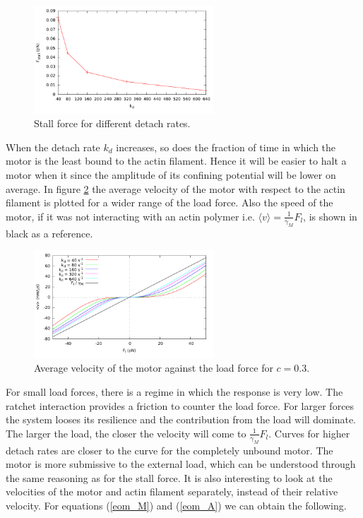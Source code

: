 \documentclass[aps,pre,onecolumn,showpacs,showkeys,a4paper]{revtex4}
\begin{document}
\begin{figure}[h]
\centering
\includegraphics[width=0.6\textwidth,height=!]{k_Fstall}
\caption{Stall force for different detach rates.}
\label{Fig: k_Fstall} 
\end{figure}
When the detach rate $k_{d}$ increases, so does the fraction of time in which the motor is the least bound to the actin filament. Hence it will be easier to halt a motor when it since the amplitude of its confining potential will be lower on average.
In figure \ref{Fig: F_v} the average velocity of the motor with respect to the actin filament is plotted for a wider range of the load force. Also the speed of the motor, if it was not  interacting with an actin polymer i.e. $\langle v \rangle = \frac{1}{\gamma_M}F_l$, is shown in black as a reference.
\begin{figure}[h]
\centering
\includegraphics[width=0.6\textwidth,height=!]{F_v}
\caption{Average velocity of the motor against the load force for $c=0.3$.}
\label{Fig: F_v} 
\end{figure}
For small load forces, there is a regime in which the response is very low. The ratchet interaction provides a friction to counter the load force. For larger forces the system looses its resilience and the contribution from the load will dominate. The larger the load, the closer the velocity will come to  $\frac{1}{\gamma_M}F_l$.
Curves for higher detach rates are closer to the curve for the completely unbound motor. The motor is more submissive to the external load, which can be understood through the same reasoning as for the stall force.
It is also interesting to look at the velocities of the motor and actin filament separately, instead of their relative velocity. For equations (\ref{eom_M}) and (\ref{eom_A}) we can obtain the following.
\end{document}
